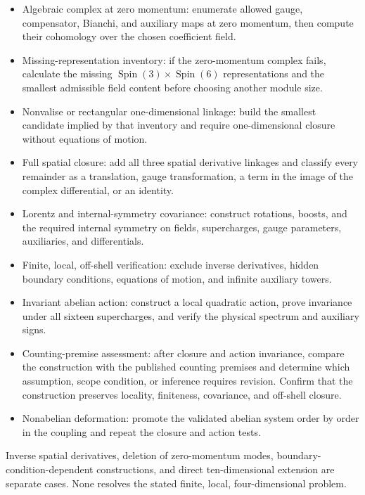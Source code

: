 \documentclass[11pt]{article}
\begin{document}
\begin{itemize}
  \item Algebraic complex at zero momentum: enumerate allowed gauge,
        compensator, Bianchi, and auxiliary maps at zero momentum, then compute
        their cohomology over the chosen coefficient field.
  \item Missing-representation inventory: if the zero-momentum complex
        fails, calculate the missing
        $\operatorname{Spin}(3)\times\operatorname{Spin}(6)$ representations
        and the smallest admissible field content before choosing another
        module size.
  \item Nonvalise or rectangular one-dimensional linkage: build the smallest
        candidate implied by that inventory and require one-dimensional closure
        without equations of motion.
  \item Full spatial closure: add all three spatial derivative
        linkages and classify every remainder as a translation, gauge
        transformation, a term in the image of the complex differential, or an
        identity.
  \item Lorentz and internal-symmetry covariance: construct rotations,
        boosts, and the required internal symmetry on fields, supercharges,
        gauge parameters, auxiliaries, and differentials.
  \item Finite, local, off-shell verification: exclude inverse derivatives,
        hidden boundary conditions, equations of motion, and infinite
        auxiliary towers.
  \item Invariant abelian action: construct a local quadratic action,
        prove invariance under all sixteen supercharges, and verify the physical
        spectrum and auxiliary signs.
  \item Counting-premise assessment: after closure and action
        invariance, compare the construction with the published counting
        premises and determine which assumption, scope condition, or inference
        requires revision.  Confirm that the construction preserves locality,
        finiteness, covariance, and off-shell closure.
  \item Nonabelian deformation: promote the validated abelian system
        order by order in the coupling and repeat the closure and action tests.
\end{itemize}

Inverse spatial derivatives, deletion of zero-momentum modes,
boundary-condition-dependent constructions, and direct ten-dimensional
extension are separate cases.  None resolves the stated finite, local,
four-dimensional problem.
\end{document}
